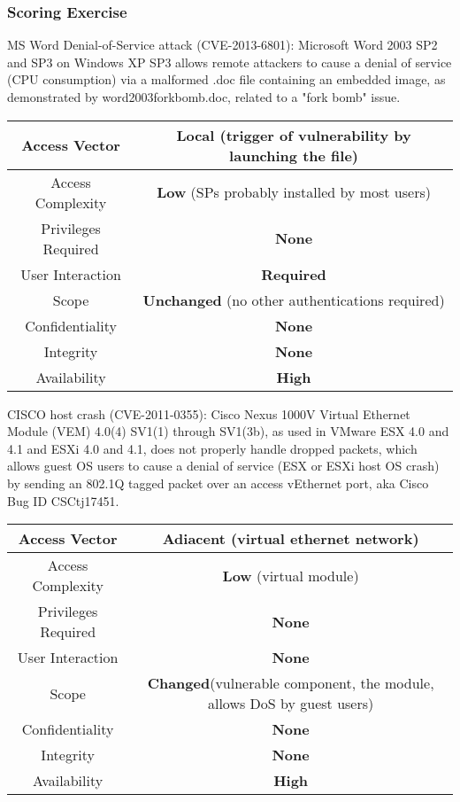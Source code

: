 \documentclass[a4paper, 10pt, titlepage]{article}
\begin{document}
\subsubsection*{Scoring Exercise}
MS Word Denial-of-Service attack (CVE-2013-6801): Microsoft Word 2003 SP2 and SP3 on Windows XP SP3 allows remote attackers to cause a denial of service (CPU consumption) via a malformed .doc file containing an embedded image, as demonstrated by word2003forkbomb.doc, related to a "fork bomb" issue.
\begin{small}
	\begin{center}
		\begin{tabular}{|c|c|}\hline
			Access Vector & \textbf{Local} (trigger of vulnerability by launching the file)\\\hline
			Access Complexity & \textbf{Low} (SPs probably installed by most users)\\\hline
			Privileges Required & \textbf{None}\\\hline
			User Interaction & \textbf{Required}\\\hline
			Scope & \textbf{Unchanged} (no other authentications required)\\\hline
			Confidentiality & \textbf{None}\\\hline
			Integrity & \textbf{None}\\\hline
			Availability & \textbf{High}\\\hline
		\end{tabular}
	\end{center}
\end{small}
CISCO host crash (CVE-2011-0355): Cisco Nexus 1000V Virtual Ethernet Module (VEM) 4.0(4) SV1(1) through SV1(3b), as used in VMware ESX 4.0 and 4.1 and ESXi 4.0 and 4.1, does not properly handle dropped packets, which allows guest OS users to cause a denial of service (ESX or ESXi host OS crash) by sending an 802.1Q tagged packet over an access vEthernet port, aka Cisco Bug ID CSCtj17451.
\begin{small}
	\begin{center}
		\begin{tabular}{|c|c|}\hline
			Access Vector & \textbf{Adiacent} (virtual ethernet network)\\\hline
			Access Complexity & \textbf{Low} (virtual module)\\\hline
			Privileges Required & \textbf{None}\\\hline
			User Interaction & \textbf{None}\\\hline
			Scope & \textbf{Changed}(vulnerable component, the module, allows DoS by guest users)\\\hline
			Confidentiality & \textbf{None}\\\hline
			Integrity & \textbf{None}\\\hline
			Availability & \textbf{High}\\\hline
		\end{tabular}
	\end{center}
\end{small}
\end{document}
